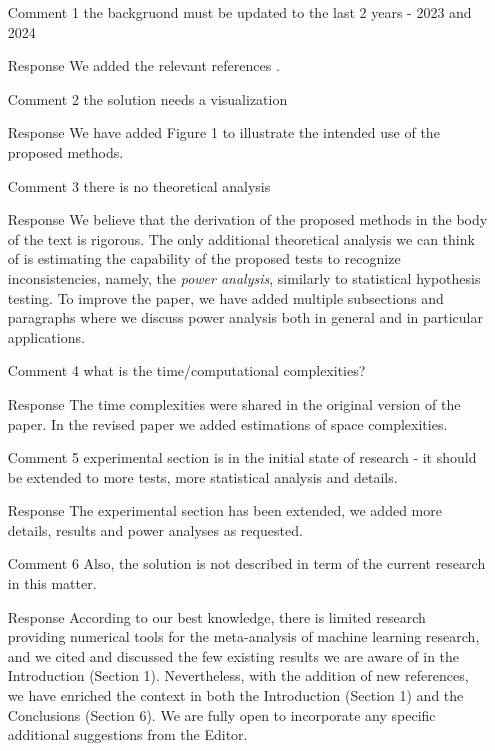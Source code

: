 \documentclass{article}
\begin{document}
\begin{itemize}
\item [Comment 1] the backgruond must be updated to the last 2 years - 2023 and 2024
\item [Response] 
We added the relevant references \cite{add0, add1, add2}.
\item [Comment 2] the solution needs a visualization
\item [Response] 
We have added Figure 1 to illustrate the intended use of the proposed methods.
\item [Comment 3] there is no theoretical analysis
\item [Response] 
We believe that the derivation of the proposed methods in the body of the text is rigorous. The only additional theoretical analysis we can think of is estimating the capability of the proposed tests to recognize inconsistencies, namely, the \emph{power analysis}, similarly to statistical hypothesis testing. To improve the paper, we have added multiple subsections and paragraphs where we discuss power analysis both in general and in particular applications.
\item [Comment 4] what is the time/computational complexities? 
\item [Response] 
The time complexities were shared in the original version of the paper. In the revised paper we added estimations of space complexities.
\item [Comment 5] experimental section is in the initial state of research - it should be extended to more tests, more statistical analysis and details.
\item [Response] 
The experimental section has been extended, we added more details, results and power analyses as requested.
\item [Comment 6] Also, the solution is not described in term of the current research in this matter.
\item [Response] 
According to our best knowledge, there is limited research providing numerical tools for the meta-analysis of machine learning research, and we cited and discussed the few existing results we are aware of in the Introduction (Section 1). Nevertheless, with the addition of new references, we have enriched the context in both the Introduction (Section 1) and the Conclusions (Section 6). We are fully open to incorporate any specific additional suggestions from the Editor.
\end{itemize}
\end{document}
